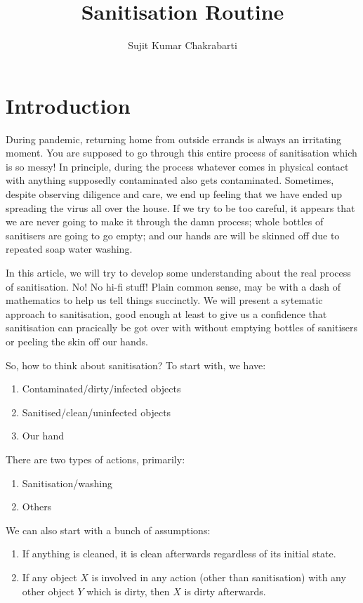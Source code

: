 \documentclass[12pts]{article}
\author{Sujit Kumar Chakrabarti}
\title{Sanitisation Routine}
\begin{document}
\maketitle

\section{Introduction}
During pandemic, returning home from outside errands is always an irritating moment. You are supposed to go through this entire process of sanitisation which is so messy! In principle, during the process whatever comes in physical contact with anything supposedly contaminated also gets contaminated. Sometimes, despite observing diligence and care, we end up feeling that we have ended up spreading the virus all over the house. If we try to be too careful, it appears that we are never going to make it through the damn process; whole bottles of sanitisers are going to go empty; and our hands are will be skinned off due to repeated soap water washing.

In this article, we will try to develop some understanding about the real process of sanitisation. No! No hi-fi stuff! Plain common sense, may be with a dash of mathematics to help us tell things succinctly. We will present a sytematic approach to sanitisation, good enough at least to give us a confidence that sanitisation can pracically be got over with without emptying bottles of sanitisers or peeling the skin off our hands.

So, how to think about sanitisation? To start with, we have:
\begin{enumerate}
\item Contaminated/dirty/infected objects
\item Sanitised/clean/uninfected objects
\item Our hand
\end{enumerate}

There are two types of actions, primarily:
\begin{enumerate}
\item Sanitisation/washing
\item Others
\end{enumerate}

We can also start with a bunch of assumptions:
\begin{enumerate}
\item If anything is cleaned, it is clean afterwards regardless of its initial state.
\item If any object $X$ is involved in any action (other than sanitisation) with any other object $Y$ which is dirty, then $X$ is dirty afterwards.
\end{enumerate}
\end{document}
